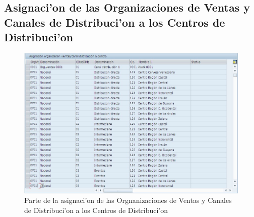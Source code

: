 \subsection*{Asignaci'on de las Organizaciones de Ventas y Canales de Distribuci'on a los Centros de Distribuci'on}
\begin{figure}[H]
\centering
\includegraphics[scale=0.65,type=jpg,ext=.jpg,read=.jpg]{figures/OrgCanalCentro}
\caption{Parte de la asignaci'on de las Orgnanizaciones de Ventas y Canales de Distribuci'on a los Centros de Distribuci'on}
\label{fig:asigna5}
\end{figure}

